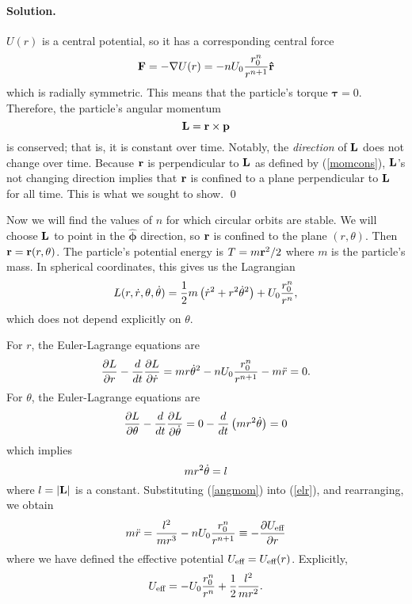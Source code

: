 \documentclass[11pt]{article}
\newcommand{\pder}[2]{\frac{\partial#1}{\partial#2}}
\newcommand{\der}[2]{\frac{d#1}{d#2}}
\newcommand{\refeq}[1]{(\ref{#1})}
\newenvironment{solution}
{
    \paragraph{Solution.}
    \ignorespaces
}
{
    \bigskip\bigskip
}
\begin{document}
\begin{enumerate}
\begin{solution}
		$U(r)$ is a central potential, so it has a corresponding central force
		\begin{equation}
			\mathbf{F} = -\nabla U(r) = -n U_0 \frac{r_0^n}{r^{n+1}} \mathbf{\hat{r}}
		\end{equation}
		which is radially symmetric.  This means that the particle's torque $\boldsymbol{\tau} = 0$.  Therefore, the particle's angular momentum
		\begin{equation} \label{momcons}
			\mathbf{L} = \mathbf{r} \times \mathbf{p}
		\end{equation}
		is conserved; that is, it is constant over time.  Notably, the \textit{direction} of $\mathbf{L}$ does not change over time.  Because $\mathbf{r}$ is perpendicular to $\mathbf{L}$ as defined by \refeq{momcons}, $\mathbf{L}$'s not changing direction implies that $\mathbf{r}$ is confined to a plane perpendicular to $\mathbf{L}$ for all time.  This is what we sought to show. \qed
		
		Now we will find the values of $n$ for which circular orbits are stable.  We will choose $\mathbf{L}$ to point in the $\boldsymbol{\hat{\phi}}$ direction, so $\mathbf{r}$ is confined to the plane $(r, \theta)$.  Then $\mathbf{r} = \mathbf{r}(r, \theta)$.  The particle's potential energy is $T = m \mathbf{r}^2 / 2$ where $m$ is the particle's mass.  In spherical coordinates, this gives us the Lagrangian
		\begin{equation}
			L(r, \dot{r}, \theta, \dot{\theta}) = \frac{1}{2} m \left(\dot{r}^2 + r^2 \dot{\theta}^2 \right) + U_0 \frac{r_0^n}{r^n},
		\end{equation}
		which does not depend explicitly on $\theta$.
		
		For $r$, the Euler-Lagrange equations are
		\begin{equation} \label{elr}
			\pder{L}{r} - \der{}{t} \pder{L}{\rd} = m r \thetad^2 - n U_0 \frac{r_0^n}{r^{n+1}} - m \rdd = 0.
		\end{equation}
		For $\theta$, the Euler-Lagrange equations are
		\begin{equation}
			\pder{L}{\theta} - \der{}{t} \pder{L}{\thetad} = 0 - \der{}{t} \left(m r^2 \thetad \right) = 0
		\end{equation}
		which implies
		\begin{equation} \label{angmom}
			m r^2 \dot{\theta} = l
		\end{equation}
		where $l = |\mathbf{L}|$ is a constant.  Substituting \refeq{angmom} into \refeq{elr}, and rearranging, we obtain
		\begin{equation}
			m \rdd = \frac{l^2}{m r^3} - n U_0 \frac{r_0^n}{r^{n+1}} \equiv -\pder{\Ueff}{r}
		\end{equation}
		where we have defined the effective potential $U_\text{eff} = U_\text{eff}(r)$.  Explicitly,
		\begin{equation} \label{ueff}
			U_\text{eff} = -U_0 \frac{r_0^n}{r^n} + \frac{1}{2} \frac{l^2}{mr^2}.
		\end{equation}
		

\end{solution}
\end{enumerate}
\end{document}

